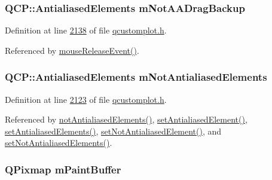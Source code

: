 \hypertarget{a00116_aac79a49a340f3e5b06465bb730431013}{
\subsubsection[{m\+Not\+A\+A\+Drag\+Backup}]{\setlength{\rightskip}{0pt plus 5cm}Q\+C\+P\+::\+Antialiased\+Elements m\+Not\+A\+A\+Drag\+Backup}}\label{a00116_aac79a49a340f3e5b06465bb730431013}


Definition at line \hyperlink{a00116_source_l02138}{2138} of file \hyperlink{a00116_source}{qcustomplot.\+h}.



Referenced by \hyperlink{a00115_source_l07691}{mouse\+Release\+Event()}.

\hypertarget{a00116_ac566e9d774e49dc4190346e02f31dcdf}{
\subsubsection[{m\+Not\+Antialiased\+Elements}]{\setlength{\rightskip}{0pt plus 5cm}Q\+C\+P\+::\+Antialiased\+Elements m\+Not\+Antialiased\+Elements}}\label{a00116_ac566e9d774e49dc4190346e02f31dcdf}


Definition at line \hyperlink{a00116_source_l02123}{2123} of file \hyperlink{a00116_source}{qcustomplot.\+h}.



Referenced by \hyperlink{a00116_source_l01970}{not\+Antialiased\+Elements()}, \hyperlink{a00115_source_l06135}{set\+Antialiased\+Element()}, \hyperlink{a00115_source_l06112}{set\+Antialiased\+Elements()}, \hyperlink{a00115_source_l06191}{set\+Not\+Antialiased\+Element()}, and \hyperlink{a00115_source_l06165}{set\+Not\+Antialiased\+Elements()}.

\hypertarget{a00116_a804ea55d1894964076fe02acf11da591}{
\subsubsection[{m\+Paint\+Buffer}]{\setlength{\rightskip}{0pt plus 5cm}Q\+Pixmap m\+Paint\+Buffer}}\label{a00116_a804ea55d1894964076fe02acf11da591}


